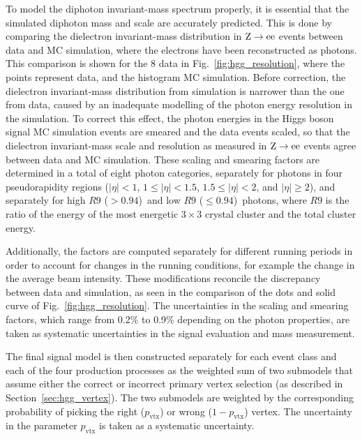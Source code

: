 \documentclass[11pt,twoside,a4paper,cmspaper,final,collab]{cms-tdr}
\begin{document}
To model the diphoton invariant-mass spectrum properly, it is essential that
the simulated diphoton mass and scale are accurately predicted.
This is done by comparing the dielectron invariant-mass distribution in
$\mathrm{Z}\to \mathrm{e}\mathrm{e}$ events between data and MC simulation, where the electrons have been
reconstructed as photons. This comparison is shown for the 8\TeV
data in Fig.~\ref{fig:hgg_resolution}, where the points represent
data, and the histogram MC simulation.
Before correction, the dielectron invariant-mass distribution from simulation is narrower than the one from data,
caused by an inadequate modelling of the photon energy resolution in the simulation.
To correct this effect, the photon energies in the Higgs boson signal MC simulation events
are smeared and the data events scaled, so that the dielectron invariant-mass scale and
resolution as measured in $\mathrm{Z}\to \mathrm{e}\mathrm{e}$ events agree between data and MC simulation.
These scaling and smearing factors are determined in a total of eight photon categories, \ie
separately for photons in four pseudorapidity regions
($|\eta|<1$, $1\leq|\eta|<1.5$, $1.5\leq|\eta|<2$, and $|\eta| \geq 2$),
and separately for high $R9$ (${>}0.94$)~and low $R9$ (${\leq}0.94$)~photons, where $R9$ is the ratio of the
energy of the  most energetic $3\times3$ crystal cluster and the total cluster energy.

Additionally, the factors are computed separately for different running periods
in order to account for changes in the running conditions, for example the change
in the average beam intensity.
These modifications reconcile the discrepancy between data and simulation,
as seen in the comparison of the dots and solid curve of
Fig.~\ref{fig:hgg_resolution}. The uncertainties
in the scaling and smearing factors, which
range from 0.2\% to 0.9\% depending on the photon properties, are taken as
systematic uncertainties in the signal evaluation and mass measurement.

The final signal model is then constructed separately for each event class
and each of the four production processes as the weighted sum of two submodels
that assume either the correct or incorrect primary vertex selection (as described in Section~\ref{sec:hgg_vertex}).
The two submodels are weighted by the corresponding probability
of picking the right ($p_\mathrm{vtx}$) or wrong ($1-p_\mathrm{vtx}$) vertex.
The uncertainty in the parameter $p_\mathrm{vtx}$ is taken as a systematic uncertainty.
\end{document}
